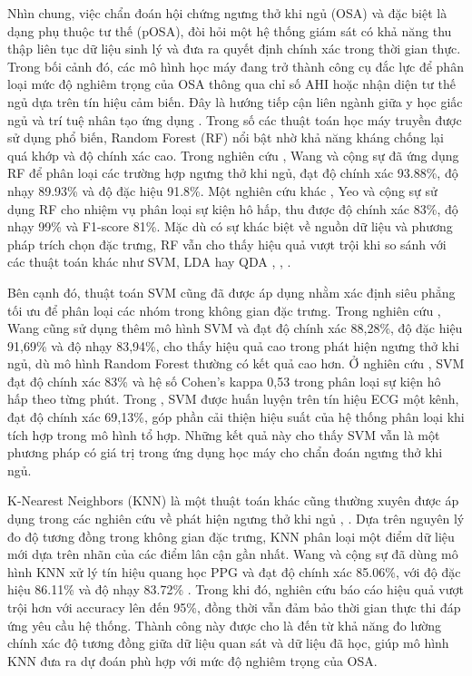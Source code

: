 Nhìn chung, việc chẩn đoán hội chứng ngưng thở khi ngủ (OSA) và đặc biệt là dạng phụ thuộc tư thế (pOSA), 
đòi hỏi một hệ thống giám sát có khả năng thu thập liên tục dữ liệu sinh lý và 
đưa ra quyết định chính xác trong thời gian thực. 
Trong bối cảnh đó, các mô hình học máy đang trở thành 
công cụ đắc lực để phân loại mức độ nghiêm trọng của OSA 
thông qua chỉ số AHI hoặc nhận diện tư thế ngủ dựa trên tín hiệu cảm biến. 
Đây là hướng tiếp cận liên ngành giữa y học giấc ngủ và trí tuệ nhân tạo ứng dụng \cite{osa_sanchez2025}.
Trong số các thuật toán học máy truyền được sử dụng phổ biến, 
Random Forest (RF) \cite{genuer2020random} nổi bật nhờ khả năng kháng chống lại quá khớp và độ chính xác cao. 
Trong nghiên cứu \cite{wang2023ml_wearable}, Wang và cộng sự đã ứng dụng RF để phân loại các trường hợp ngưng thở khi ngủ, đạt độ chính xác 93.88\%, độ nhạy 89.93\% và độ đặc hiệu 91.8\%. 
Một nghiên cứu khác \cite{yeo2022respiratory}, Yeo và cộng sự sử dụng RF cho nhiệm vụ phân loại sự kiện hô hấp, thu được độ chính xác 83\%, độ nhạy 99\% và F1-score 81\%. 
Mặc dù có sự khác biệt về nguồn dữ liệu và phương pháp trích chọn đặc trưng, RF vẫn cho thấy hiệu quả vượt trội khi 
so sánh với các thuật toán khác như SVM, LDA hay QDA \cite{wang2023ml_wearable}, \cite{yeo2022respiratory}, \cite{parbat2024multiscale}.

Bên cạnh đó, thuật toán SVM \cite{cortes1995svm} cũng đã được áp dụng nhằm xác định siêu phẳng tối ưu để phân loại các nhóm trong không gian đặc trưng. 
Trong nghiên cứu \cite{wang2023ml_wearable}, Wang cũng sử dụng thêm mô hình SVM và đạt độ chính xác 88,28\%, độ đặc hiệu 91,69\% và độ nhạy 83,94\%, 
cho thấy hiệu quả cao trong phát hiện ngưng thở khi ngủ, dù mô hình Random Forest thường có kết quả cao hơn.
Ở nghiên cứu \cite{yeo2022respiratory}, SVM đạt độ chính xác 83\% và hệ số Cohen’s kappa 0,53 trong phân loại sự kiện hô hấp theo từng phút. 
Trong \cite{parbat2024multiscale}, SVM được huấn luyện trên tín hiệu ECG một kênh, đạt độ chính xác 69,13\%, góp phần cải thiện hiệu suất của hệ thống phân loại khi tích hợp trong mô hình tổ hợp. 
Những kết quả này cho thấy SVM vẫn là một phương pháp có giá trị trong ứng dụng học máy cho chẩn đoán ngưng thở khi ngủ.

K-Nearest Neighbors (KNN) \cite{cunningham2007knn} là một thuật toán khác 
cũng thường xuyên được áp dụng trong các nghiên cứu 
về phát hiện ngưng thở khi ngủ \cite{wang2023ml_wearable}, \cite{jeon2020realtime}. 
Dựa trên nguyên lý đo độ tương đồng trong không gian đặc trưng, 
KNN phân loại một điểm dữ liệu mới dựa trên nhãn của các điểm lân cận gần nhất. 
Wang và cộng sự đã dùng mô hình KNN xử lý tín hiệu quang học PPG và đạt độ chính xác 85.06\%, với độ đặc hiệu 86.11\% và độ nhạy 83.72\% \cite{wang2023ml_wearable}. 
Trong khi đó, nghiên cứu \cite{jeon2020realtime} báo cáo hiệu quả vượt trội hơn với accuracy lên đến 95\%, đồng thời vẫn đảm bảo thời gian thực thi đáp ứng yêu cầu hệ thống. 
Thành công này được cho là đến từ khả năng đo lường chính xác độ tương đồng giữa dữ liệu quan sát và dữ liệu đã học, 
giúp mô hình KNN đưa ra dự đoán phù hợp với mức độ nghiêm trọng của OSA.

